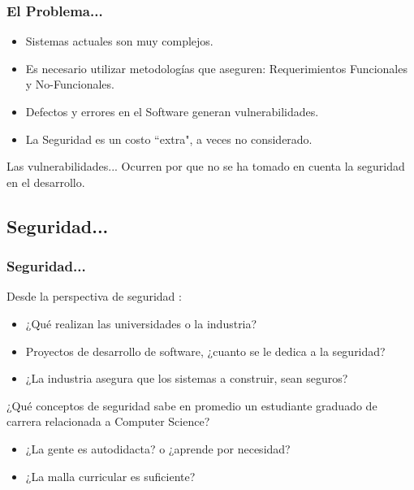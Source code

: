 \documentclass[serif,9pt]{beamer}
\begin{document}
\begin{frame}
	\frametitle{El Problema...}
	\begin{itemize}
		\item Sistemas actuales son muy complejos.
		\item Es necesario utilizar metodologías que aseguren: Requerimientos Funcionales y No-Funcionales.
		\item Defectos y errores en el Software generan vulnerabilidades.
		\item La Seguridad es un costo ``extra", a veces no considerado.
	\end{itemize}
	\begin{block}{Las vulnerabilidades...}
		Ocurren por que no se ha tomado en cuenta la seguridad en el desarrollo.
	\end{block}
\end{frame}


\subsection{Seguridad...}
\begin{frame}
\frametitle{Seguridad...}
	\begin{block}{Desde la perspectiva de seguridad \cite{WhyteHarrison}:}
		\begin{itemize}		
			\item ¿Qu\'e realizan las universidades o la industria?
			\item Proyectos de desarrollo de software, ¿cuanto se le dedica a la seguridad?
			\item ¿La industria asegura que los sistemas a construir, sean seguros?
		\end{itemize}
	\end{block}
	\begin{block}{¿Qu\'e conceptos de seguridad sabe en promedio un estudiante graduado de carrera relacionada a Computer Science?}
		\begin{itemize}
			\item ¿La gente es autodidacta? o ¿aprende por necesidad?
			\item ¿La malla curricular es suficiente?
		\end{itemize}
	\end{block}
\end{frame}
\end{document}
